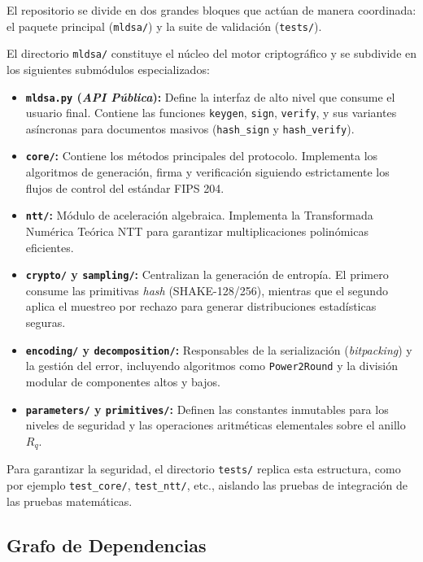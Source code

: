 \documentclass[11pt, a4paper]{report}
\theoremstyle{definition}
\begin{document}
El repositorio se divide en dos grandes bloques que actúan de manera coordinada: el paquete principal (\texttt{mldsa/}) y la suite de validación (\texttt{tests/}). 

El directorio \texttt{mldsa/} constituye el núcleo del motor criptográfico y se subdivide en los siguientes submódulos especializados:

\begin{itemize}
    \item \textbf{\texttt{mldsa.py} (\textit{API Pública}):} Define la interfaz de alto nivel que consume el usuario final. Contiene las funciones \texttt{keygen}, \texttt{sign}, \texttt{verify}, y sus variantes asíncronas para documentos masivos (\texttt{hash\_sign} y \texttt{hash\_verify}).
    \item \textbf{\texttt{core/}:} Contiene los métodos principales del protocolo. Implementa los algoritmos de generación, firma y verificación siguiendo estrictamente los flujos de control del estándar FIPS 204.
    \item \textbf{\texttt{ntt/}:} Módulo de aceleración algebraica. Implementa la Transformada Numérica Teórica NTT para garantizar multiplicaciones polinómicas eficientes.
    \item \textbf{\texttt{crypto/} y \texttt{sampling/}:} Centralizan la generación de entropía. El primero consume las primitivas \textit{hash} (SHAKE-128/256), mientras que el segundo aplica el muestreo por rechazo para generar distribuciones estadísticas seguras.
    \item \textbf{\texttt{encoding/} y \texttt{decomposition/}:} Responsables de la serialización (\textit{bitpacking}) y la gestión del error, incluyendo algoritmos como \texttt{Power2Round} y la división modular de componentes altos y bajos.
    \item \textbf{\texttt{parameters/} y \texttt{primitives/}:} Definen las constantes inmutables para los niveles de seguridad y las operaciones aritméticas elementales sobre el anillo $R_q$.
\end{itemize}

Para garantizar la seguridad, el directorio \texttt{tests/} replica esta estructura, como por ejemplo \texttt{test\_core/}, \texttt{test\_ntt/}, etc., aislando las pruebas de integración de las pruebas matemáticas.

\subsection{Grafo de Dependencias}
\end{document}

